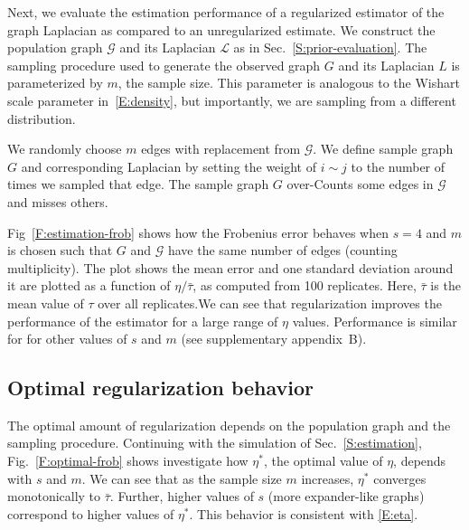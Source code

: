 \documentclass[12pt]{article}
\theoremstyle{plain}
\begin{document}
Next, we evaluate the estimation performance of a regularized
estimator of the graph Laplacian as compared to an unregularized
estimate.  We construct the population graph $\mathcal{G}$ and its
Laplacian $\mathcal{L}$ as in Sec.~\ref{S:prior-evaluation}.  The
sampling procedure used to generate the observed graph $G$ and its
Laplacian $L$ is parameterized by $m$, the sample size.  This
parameter is analogous to the Wishart scale parameter
in~\eqref{E:density}, but importantly, we are sampling from a
different distribution.

We randomly choose $m$ edges with replacement from $\mathcal{G}$.  We
define sample graph $G$ and corresponding Laplacian by setting the
weight of $i \sim j$ to the number of times we sampled that edge.  The
sample graph $G$ over-Counts some edges in $\mathcal{G}$ and misses
others.

Fig~\ref{F:estimation-frob} shows how the Frobenius error behaves when
$s = 4$ and $m$ is chosen such that $G$ and $\mathcal{G}$ have the
same number of edges (counting multiplicity).  The plot shows the mean
error and one standard deviation around it are plotted as a function
of $\eta/\bar \tau$, as computed from 100 replicates.  Here,
$\bar \tau$ is the mean value of $\tau$ over all replicates.We can see
that regularization improves the performance of the estimator for a
large range of $\eta$ values.  Performance is similar for for other
values of $s$ and $m$ (see supplementary appendix~B).


\subsection{Optimal regularization behavior}\label{S:optimal}

The optimal amount of regularization depends on the population graph
and the sampling procedure.  Continuing with the simulation of
Sec.~\ref{S:estimation}, Fig.~\ref{F:optimal-frob} shows investigate
how $\eta^\ast$, the optimal value of $\eta$, depends with $s$ and
$m$.  We can see that as the sample size $m$ increases, $\eta^\ast$ converges
monotonically to $\bar \tau$.  Further, higher values of $s$ (more
expander-like graphs) correspond to higher values of $\eta^\ast$.
This behavior is consistent with \eqref{E:eta}.






\clearpage


%

\end{document}
